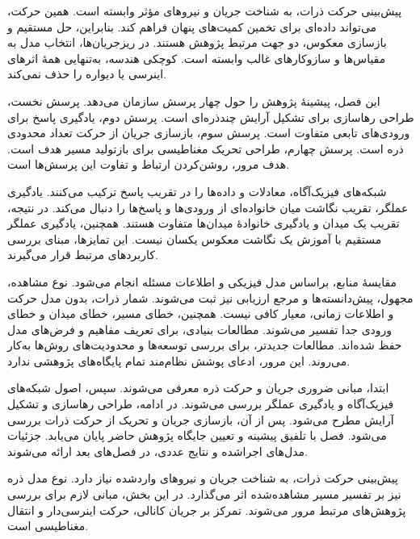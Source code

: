 \label{ch:literature-review}

\label{sec:lit-review-introduction}

پیش‌بینی حرکت ذرات، به شناخت جریان و نیروهای مؤثر وابسته است.
همین حرکت، می‌تواند داده‌ای برای تخمین کمیت‌های پنهان فراهم کند.
بنابراین، حل مستقیم و بازسازی معکوس، دو جهت مرتبط پژوهش هستند.
در ریزجریان‌ها، انتخاب مدل به مقیاس‌ها و سازوکارهای غالب وابسته است.
کوچکی هندسه، به‌تنهایی همهٔ اثرهای اینرسی یا دیواره را حذف نمی‌کند.
\cite{SquiresQuake2005}

این فصل، پیشینهٔ پژوهش را حول چهار پرسش سازمان می‌دهد.
پرسش نخست، طراحی رهاسازی برای تشکیل آرایش چندذره‌ای است.
پرسش دوم، یادگیری پاسخ برای ورودی‌های تابعی متفاوت است.
پرسش سوم، بازسازی جریان از حرکت تعداد محدودی ذره است.
پرسش چهارم، طراحی تحریک مغناطیسی برای بازتولید مسیر هدف است.
هدف مرور، روشن‌کردن ارتباط و تفاوت این پرسش‌ها است.

شبکه‌های فیزیک‌آگاه، معادلات و داده‌ها را در تقریب پاسخ ترکیب می‌کنند.
یادگیری عملگر، تقریب نگاشت میان خانواده‌ای از ورودی‌ها و پاسخ‌ها را دنبال می‌کند.
در نتیجه، تقریب یک میدان و یادگیری خانوادهٔ میدان‌ها متفاوت هستند.
همچنین، یادگیری عملگر مستقیم با آموزش یک نگاشت معکوس یکسان نیست.
این تمایزها، مبنای بررسی کاربردهای مرتبط قرار می‌گیرند.
\cite{Raissi2019PINN,Kovachki2023NeuralOperator}

مقایسهٔ منابع، براساس مدل فیزیکی و اطلاعات مسئله انجام می‌شود.
نوع مشاهده، مجهول، پیش‌دانسته‌ها و مرجع ارزیابی نیز ثبت می‌شوند.
شمار ذرات، بدون مدل حرکت و اطلاعات زمانی، معیار کافی نیست.
همچنین، خطای مسیر، خطای میدان و خطای ورودی جدا تفسیر می‌شوند.
مطالعات بنیادی، برای تعریف مفاهیم و فرض‌های مدل حفظ شده‌اند.
مطالعات جدیدتر، برای بررسی توسعه‌ها و محدودیت‌های روش‌ها به‌کار می‌روند.
این مرور، ادعای پوشش نظام‌مند تمام پایگاه‌های پژوهشی ندارد.

ابتدا، مبانی ضروری جریان و حرکت ذره معرفی می‌شوند.
سپس، اصول شبکه‌های فیزیک‌آگاه و یادگیری عملگر بررسی می‌شوند.
در ادامه، طراحی رهاسازی و تشکیل آرایش مطرح می‌شود.
پس از آن، بازسازی جریان و تحریک از حرکت ذرات بررسی می‌شود.
فصل با تلفیق پیشینه و تعیین جایگاه پژوهش حاضر پایان می‌یابد.
جزئیات مدل‌های اجراشده و نتایج عددی، در فصل‌های بعد ارائه می‌شوند.

\label{sec:lit-flow-particle-foundations}

پیش‌بینی حرکت ذرات، به شناخت جریان و نیروهای واردشده نیاز دارد.
نوع مدل ذره نیز بر تفسیر مسیر مشاهده‌شده اثر می‌گذارد.
در این بخش، مبانی لازم برای بررسی پژوهش‌های مرتبط مرور می‌شوند.
تمرکز بر جریان کانالی، حرکت اینرسی‌دار و انتقال مغناطیسی است.

